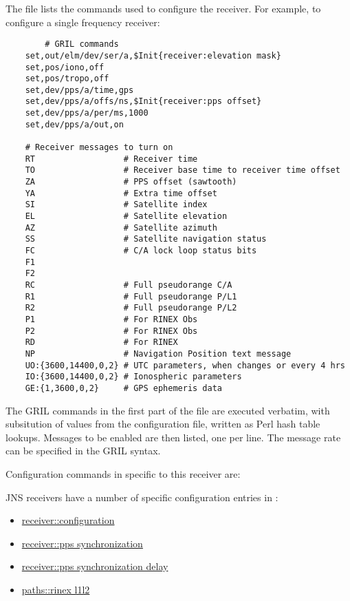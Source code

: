 The file  lists the commands used to configure the receiver.
For example, to configure a single frequency receiver:
\begin{lstlisting}
		# GRIL commands
    set,out/elm/dev/ser/a,$Init{receiver:elevation mask}
    set,pos/iono,off  
    set,pos/tropo,off 
    set,dev/pps/a/time,gps
    set,dev/pps/a/offs/ns,$Init{receiver:pps offset}
    set,dev/pps/a/per/ms,1000
    set,dev/pps/a/out,on
    
    # Receiver messages to turn on
    RT                  # Receiver time
    TO                  # Receiver base time to receiver time offset
    ZA                  # PPS offset (sawtooth)
    YA                  # Extra time offset 
    SI                  # Satellite index
    EL                  # Satellite elevation
    AZ                  # Satellite azimuth
    SS                  # Satellite navigation status
    FC                  # C/A lock loop status bits
    F1 
    F2 
    RC                  # Full pseudorange C/A
    R1                  # Full pseudorange P/L1
    R2                  # Full pseudorange P/L2
    P1                  # For RINEX Obs
    P2                  # For RINEX Obs
    RD                  # For RINEX
    NP                  # Navigation Position text message
    UO:{3600,14400,0,2} # UTC parameters, when changes or every 4 hrs
    IO:{3600,14400,0,2} # Ionospheric parameters
    GE:{1,3600,0,2}     # GPS ephemeris data
\end{lstlisting}
The GRIL commands in the first part of the file are executed verbatim, with subsitution
of values from the configuration file, written as Perl hash table lookups. 
Messages to be enabled are then listed, one per line. The message rate can be specified 
in the GRIL syntax.

Configuration commands in  specific to this receiver are:

JNS receivers have a number of specific configuration entries in :
\begin{itemize}
\item \hyperlink{h:configuration}{receiver::configuration}
\item \hyperlink{h:pps_synchronization}{receiver::pps synchronization}
\item \hyperlink{h:pps_synchronization_delay}{receiver::pps synchronization delay}
\item \hyperlink{h:paths_rinex_l1l2}{paths::rinex l1l2}
\end{itemize}

